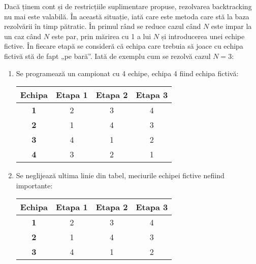 Dacă ținem cont și de restricțiile suplimentare propuse, rezolvarea
backtracking nu mai este valabilă. În această situație, iată care este metoda
care stă la baza rezolvării în timp pătratic. În primul rând se reduce cazul
când $N$ este impar la un caz când $N$ este par, prin mărirea cu 1 a lui $N$
și introducerea unei echipe fictive. În fiecare etapă se consideră că echipa
care trebuia să joace cu echipa fictivă stă de fapt „pe bară”. Iată de exemplu
cum se rezolvă cazul $N = 3$:

\begin{enumerate}[label=(\alph*)]

\item Se programează un campionat cu 4 echipe, echipa 4 fiind echipa
  fictivă:

  \begin{table}[H]
    \centering
    \begin{tabular}{c|ccc}
      \hline
          {\bf Echipa} & {\bf Etapa 1} & {\bf Etapa 2} & {\bf Etapa 3}\\ \hline
          {\bf 1}      & 2             & 3             & 4 \\
          {\bf 2}      & 1             & 4             & 3 \\
          {\bf 3}      & 4             & 1             & 2 \\
          {\bf 4}      & 3             & 2             & 1 \\
          \hline
    \end{tabular}
  \end{table}

\item Se neglijează ultima linie din tabel, meciurile echipei fictive nefiind
  importante:

  \begin{table}[H]
    \centering
    \begin{tabular}{c|ccc}
      \hline
          {\bf Echipa} & {\bf Etapa 1} & {\bf Etapa 2} & {\bf Etapa 3}\\ \hline
          {\bf 1}      & 2             & 3             & 4 \\
          {\bf 2}      & 1             & 4             & 3 \\
          {\bf 3}      & 4             & 1             & 2 \\
          \hline
    \end{tabular}
  \end{table}


\end{enumerate}
